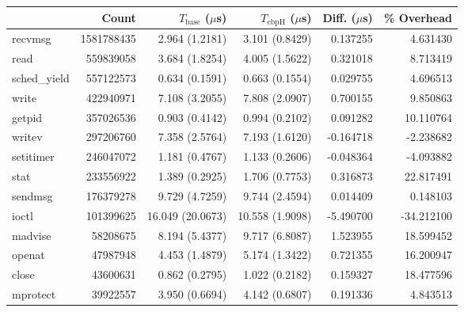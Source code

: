 \begin{tabular}{>{\ttfamily}lrrrrr}
\toprule
\multicolumn{1}{l}{System Call} &       Count & $T_\text{base}$ ($\mu$s) & $T_\text{ebpH}$ ($\mu$s) &  Diff. ($\mu$s) &  \% Overhead \\
\midrule
                        recvmsg &  1581788435 &           2.964 (1.2181) &           3.101 (0.8429) &        0.137255 &     4.631430 \\
                           read &   559839058 &           3.684 (1.8254) &           4.005 (1.5622) &        0.321018 &     8.713419 \\
                    sched_yield &   557122573 &           0.634 (0.1591) &           0.663 (0.1554) &        0.029755 &     4.696513 \\
                          write &   422940971 &           7.108 (3.2055) &           7.808 (2.0907) &        0.700155 &     9.850863 \\
                         getpid &   357026536 &           0.903 (0.4142) &           0.994 (0.2102) &        0.091282 &    10.110764 \\
                         writev &   297206760 &           7.358 (2.5764) &           7.193 (1.6120) &       -0.164718 &    -2.238682 \\
                      setitimer &   246047072 &           1.181 (0.4767) &           1.133 (0.2606) &       -0.048364 &    -4.093882 \\
                           stat &   233556922 &           1.389 (0.2925) &           1.706 (0.7753) &        0.316873 &    22.817491 \\
                        sendmsg &   176379278 &           9.729 (4.7259) &           9.744 (2.4594) &        0.014409 &     0.148103 \\
                          ioctl &   101399625 &         16.049 (20.0673) &          10.558 (1.9098) &       -5.490700 &   -34.212100 \\
                        madvise &    58208675 &           8.194 (5.4377) &           9.717 (6.8087) &        1.523955 &    18.599452 \\
                         openat &    47987948 &           4.453 (1.4879) &           5.174 (1.3422) &        0.721355 &    16.200947 \\
                          close &    43600631 &           0.862 (0.2795) &           1.022 (0.2182) &        0.159327 &    18.477596 \\
                       mprotect &    39922557 &           3.950 (0.6694) &           4.142 (0.6807) &        0.191336 &     4.843513 \\

\end{tabular}
